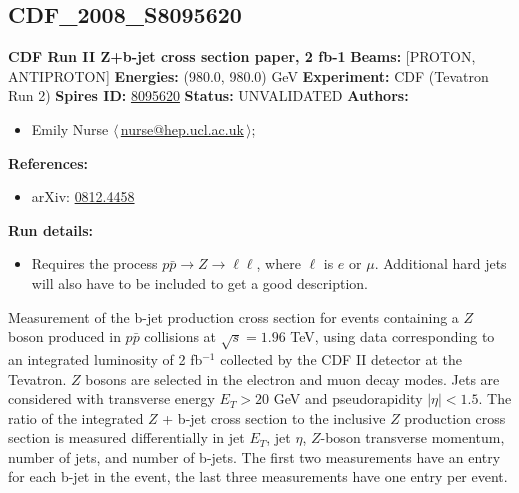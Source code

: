 \subsection[CDF\_2008\_S8095620]{CDF\_2008\_S8095620\,\cite{Aaltonen:2008mt}}
\textbf{CDF Run II Z+b-jet cross section paper, 2 fb-1}\newline
\textbf{Beams:} [PROTON, ANTIPROTON] \newline
\textbf{Energies:} (980.0, 980.0) GeV \newline
\textbf{Experiment:} CDF (Tevatron Run 2) \newline
\textbf{Spires ID:} \href{http://www.slac.stanford.edu/spires/find/hep/www?rawcmd=key+8095620}{8095620}\newline
\textbf{Status:} UNVALIDATED\newline
\textbf{Authors:}
\begin{itemize}
  \item Emily Nurse $\langle\,$\href{mailto:nurse@hep.ucl.ac.uk}{nurse@hep.ucl.ac.uk}$\,\rangle$;
\end{itemize}
\textbf{References:}
\begin{itemize}
  \item arXiv: \href{http://arxiv.org/abs/0812.4458}{0812.4458}
\end{itemize}
\textbf{Run details:}
\begin{itemize}

  \item Requires the process $p\bar{p} \rightarrow {Z} \rightarrow{\ell}\ell$, where $\ell$ is $e$ or $\mu$. Additional hard jets will also have to be included to get a good description.\end{itemize}

\noindent Measurement of the b-jet production cross section for events containing a $Z$ boson produced in $p\bar{p}$ collisions at $\sqrt{s}=1.96$ TeV, using data corresponding to an integrated luminosity of 2 fb$^{-1}$ collected by the CDF II detector at the Tevatron. $Z$ bosons are selected in the electron and muon decay modes. Jets are considered with transverse energy $E_T>20$ GeV and pseudorapidity $|\eta|<1.5$. The ratio of the integrated $Z$ + b-jet cross section to the inclusive $Z$ production cross section is measured differentially in jet $E_T$, jet $\eta$, $Z$-boson transverse momentum, number of jets, and number of b-jets. The first two measurements have an entry for each b-jet in the event, the last three measurements have one entry per event.

